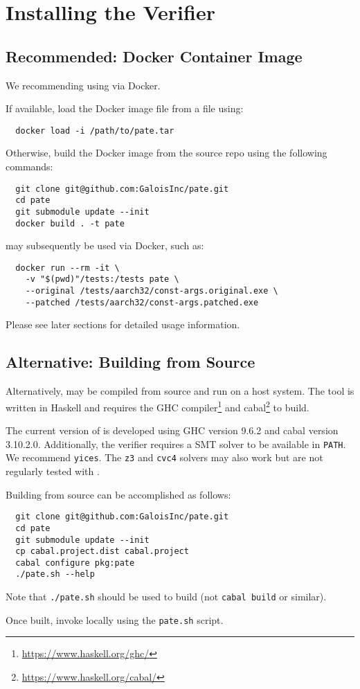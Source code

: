 \section{Installing the \pate{} Verifier}
\label{sec:build-pate-verif}

\subsection{Recommended: Docker Container Image}

We recommending using \pate{} via Docker.

If available, load the Docker image file from a file using:
\begin{verbatim}
  docker load -i /path/to/pate.tar
\end{verbatim}

Otherwise, build the Docker image from the \pate{} source repo using the following commands:

\begin{verbatim}
  git clone git@github.com:GaloisInc/pate.git
  cd pate
  git submodule update --init
  docker build . -t pate
\end{verbatim}

\pate{} may subsequently be used via Docker, such as:

\begin{verbatim}
  docker run --rm -it \
    -v "$(pwd)"/tests:/tests pate \
    --original /tests/aarch32/const-args.original.exe \
    --patched /tests/aarch32/const-args.patched.exe
\end{verbatim}

Please see later sections for detailed usage information.

\subsection{Alternative: Building from Source}

Alternatively, \pate{} may be compiled from source and run on a host system.
The \pate{} tool is written in Haskell and requires the GHC compiler\footnote{\url{https://www.haskell.org/ghc/}} and cabal\footnote{\url{https://www.haskell.org/cabal/}} to build.

The current version of \pate{} is developed using GHC version 9.6.2 and cabal version 3.10.2.0.
Additionally, the verifier requires a SMT solver to be available in \texttt{PATH}.
We recommend \texttt{yices}.
The \texttt{z3} and \texttt{cvc4} solvers may also work but are not regularly tested with \pate{}.

Building from source can be accomplished as follows:
\begin{verbatim}
  git clone git@github.com:GaloisInc/pate.git
  cd pate
  git submodule update --init
  cp cabal.project.dist cabal.project
  cabal configure pkg:pate
  ./pate.sh --help
\end{verbatim}

Note that \texttt{./pate.sh} should be used to build \pate{} (not \texttt{cabal build} or similar).

Once built, invoke \pate{} locally using the \texttt{pate.sh} script.

